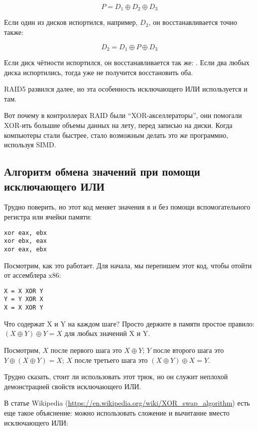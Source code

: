 \begin{equation} \label{eq:RAID4}
P = D_1 \oplus D_2 \oplus D_3
\end{equation}

Если один из дисков испортился, например, $D_2$, он восстанавливается точно также:

\begin{equation}
D_2 = D_1 \oplus P \oplus D_3
\end{equation}

Если диск чётности испортился, он восстанавливается так же: .
Если два любых диска испортились, тогда уже не получится восстановить оба.

\ac{RAID}5 развился далее, но эта особенность исключающего ИЛИ используется и там.

Вот почему в контроллерах \ac{RAID} были ``XOR-акселлераторы'', они помогали XOR-ить большие объемы данных
на лету, перед записью на диски.
Когда компьютеры стали быстрее, стало возможным делать это же программно, используя \ac{SIMD}.

\subsection{Алгоритм обмена значений при помощи исключающего ИЛИ}

Трудно поверить, но этот код меняет значения в \EAX и \EBX без помощи вспомогательного регистра или ячейки памяти:

\begin{lstlisting}[style=customasmx86]
xor eax, ebx
xor ebx, eax
xor eax, ebx
\end{lstlisting}

Посмотрим, как это работает.
Для начала, мы перепишем этот код, чтобы отойти от ассемблера x86:

\begin{lstlisting}
X = X XOR Y
Y = Y XOR X
X = X XOR Y
\end{lstlisting}

Что содержат X и Y на каждом шаге?
Просто держите в памяти простое правило: $(X \oplus Y) \oplus Y = X$ для любых значений X и Y.

Посмотрим,
$X$ после первого шага это $X \oplus Y$;
$Y$ после второго шага это $Y \oplus (X \oplus Y) = X$;
$X$ после третьего шага это $(X \oplus Y) \oplus X = Y$.

Трудно сказать, стоит ли использовать этот трюк, но он служит неплохой демонстрацией свойств исключающего ИЛИ.

В статье Wikipedia (\url{https://en.wikipedia.org/wiki/XOR_swap_algorithm}) есть еще такое объяснение:
можно использовать сложение и вычитание вместо исключающего ИЛИ:


